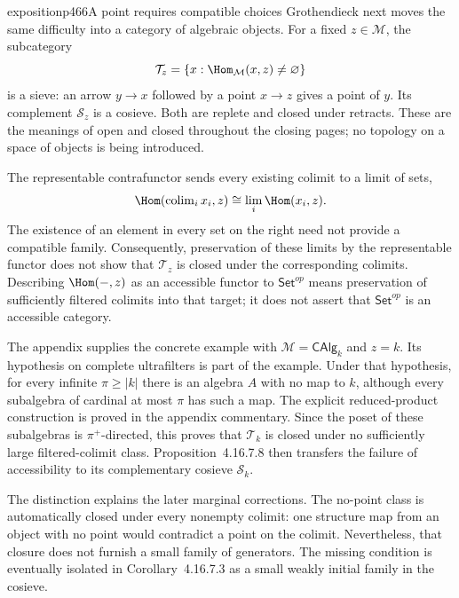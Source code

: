 \begin{dcomment}{exposition}{p466}{A point requires compatible choices}
Grothendieck next moves the same difficulty into a category of algebraic objects. For a fixed $z\in\mathcal M$, the subcategory
\[
 \mathcal T_z=\{x:\Hom_{\mathcal M}(x,z)\ne\varnothing\}
\]
is a sieve: an arrow $y\to x$ followed by a point $x\to z$ gives a point of $y$. Its complement $\mathcal S_z$ is a cosieve. Both are replete and closed under retracts. These are the meanings of open and closed throughout the closing pages; no topology on a space of objects is being introduced.

The representable contrafunctor sends every existing colimit to a limit of sets,
\[
 \Hom(\operatorname{colim}_i x_i,z)
 \cong\lim_i\Hom(x_i,z).
\]
The existence of an element in every set on the right need not provide a compatible family. Consequently, preservation of these limits by the representable functor does not show that $\mathcal T_z$ is closed under the corresponding colimits. Describing $\Hom(-,z)$ as an accessible functor to $\mathsf{Set}^{op}$ means preservation of sufficiently filtered colimits into that target; it does not assert that $\mathsf{Set}^{op}$ is an accessible category.

The appendix supplies the concrete example with $\mathcal M=\mathsf{CAlg}_k$ and $z=k$. Its hypothesis on complete ultrafilters is part of the example. Under that hypothesis, for every infinite $\pi\geq|k|$ there is an algebra $A$ with no map to $k$, although every subalgebra of cardinal at most $\pi$ has such a map. The explicit reduced-product construction is proved in the appendix commentary. Since the poset of these subalgebras is $\pi^+$-directed, this proves that $\mathcal T_k$ is closed under no sufficiently large filtered-colimit class. Proposition~4.16.7.8 then transfers the failure of accessibility to its complementary cosieve $\mathcal S_k$.

The distinction explains the later marginal corrections. The no-point class is automatically closed under every nonempty colimit: one structure map from an object with no point would contradict a point on the colimit. Nevertheless, that closure does not furnish a small family of generators. The missing condition is eventually isolated in Corollary~4.16.7.3 as a small weakly initial family in the cosieve.
\end{dcomment}

